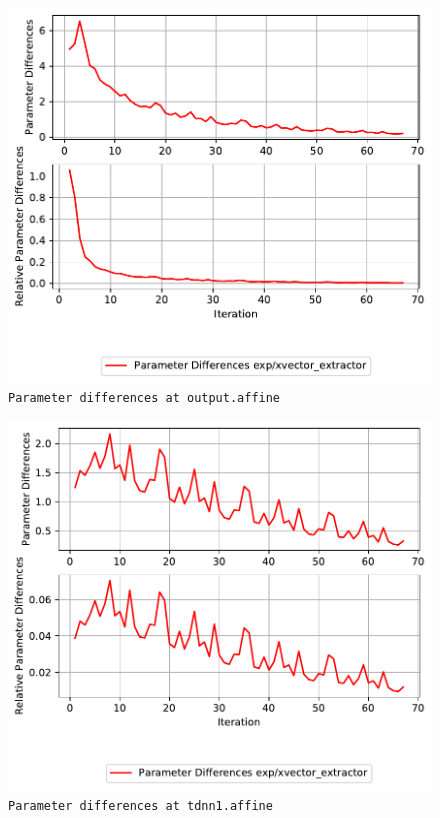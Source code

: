 \documentclass[prl,10pt,twocolumn]{revtex4}
\begin{document}
\newpage
\begin{figure}[h]
  \begin{center}
    \caption{\texttt{Parameter differences at output.affine}}
    \includegraphics[width=\textwidth]{exp/xvector_extractor/report/param_diff_output_dot_affine.pdf}
  \end{center}
\end{figure}
\clearpage


\newpage
\begin{figure}[h]
  \begin{center}
    \caption{\texttt{Parameter differences at tdnn1.affine}}
    \includegraphics[width=\textwidth]{exp/xvector_extractor/report/param_diff_tdnn1_dot_affine.pdf}
  \end{center}
\end{figure}
\clearpage
\end{document}
